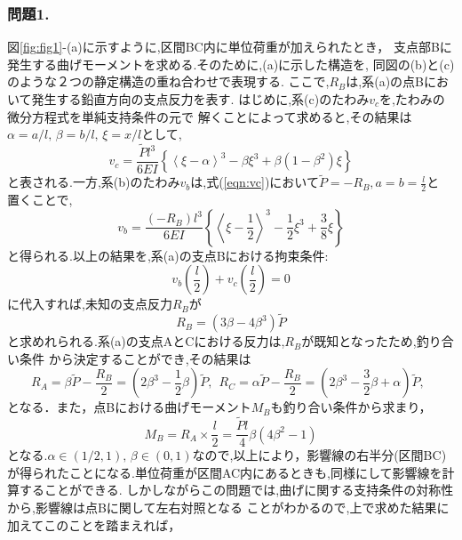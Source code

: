 ﻿\documentclass[10pt,a4j]{jarticle}
\begin{document}
\subsubsection*{問題1.}
図\ref{fig:fig1}-(a)に示すように,区間BC内に単位荷重が加えられたとき，
支点部Bに発生する曲げモーメントを求める.そのために,(a)に示した構造を,
同図の(b)と(c)のような２つの静定構造の重ね合わせで表現する.
ここで,$R_B$は,系(a)の点Bにおいて発生する鉛直方向の支点反力を表す.
はじめに,系(c)のたわみ$v_c$を,たわみの微分方程式を単純支持条件の元で
解くことによって求めると,その結果は$\alpha=a/l,\, \beta=b/l, \, \xi=x/l$として,
\begin{equation}
 v_c=\frac{\tilde Pl^3}{6EI}\left\{
 \left< \xi-\alpha \right>^3 -\beta \xi^3 +\beta (1-\beta^2)\xi 
 \right\}
 \label{eqn:vc}
\end{equation}
と表される.一方,系(b)のたわみ$v_b$は,式(\ref{eqn:vc})において$\tilde P=-R_B, a=b=\frac{l}{2}$と
置くことで,
\begin{equation}
 v_b=\frac{(-R_B)l^3}{6EI}\left\{
		\left< \xi-\frac{1}{2} \right>^3 -\frac{1}{2} \xi^3 +\frac{3}{8}\xi 
	\right\}
	\label{eqn:vb}
\end{equation}
と得られる.以上の結果を,系(a)の支点Bにおける拘束条件:
\begin{equation}
	v_b\left(\frac{l}{2}\right) 
	+
	v_c\left(\frac{l}{2}\right) =0
\end{equation}
に代入すれば,未知の支点反力$R_B$が
\begin{equation}
	R_B=(3\beta-4\beta^3)\tilde P
	\label{eqn:RB}
\end{equation}
と求めれられる.系(a)の支点AとCにおける反力は,$R_B$が既知となったため,釣り合い条件
から決定することができ,その結果は
\begin{equation}
	R_A=\beta \tilde P -\frac{R_B}{2}=\left(2\beta^3-\frac{1}{2}\beta \right)\tilde P, \ \ 
	R_C=\alpha \tilde P -\frac{R_B}{2}=\left(2\beta^3-\frac{3}{2}\beta +\alpha \right)\tilde P, \ \ 
\end{equation}
となる．また，点Bにおける曲げモーメント$M_B$も釣り合い条件から求まり，
\begin{equation}
	M_B=R_A\times\frac{l}{2}=\frac{\tilde Pl}{4} \beta (4\beta^2-1)
\end{equation}
となる.$\alpha \in (1/2,1), \, \beta \in (0,1)$なので,以上により，影響線の右半分(区間BC)
が得られたことになる.単位荷重が区間AC内にあるときも,同様にして影響線を計算することができる. 
しかしながらこの問題では,曲げに関する支持条件の対称性から,影響線は点Bに関して左右対照となる
ことがわかるので,上で求めた結果に加えてこのことを踏まえれば，
\end{document}
